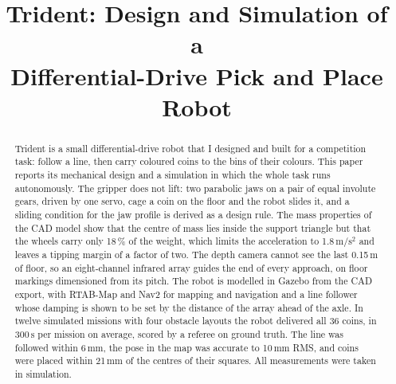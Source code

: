 \documentclass[conference,a4paper]{IEEEtran}
\newcommand{\unit}[1]{\ensuremath{\,\mathrm{#1}}}
\begin{document}
\title{Trident: Design and Simulation of a\\Differential-Drive Pick and Place Robot}

\author{
}

\maketitle

\begin{abstract}
Trident is a small differential-drive robot that I designed and built for a competition
task: follow a line, then carry coloured coins to the bins of their colours. This paper
reports its mechanical design and a simulation in which the whole task runs autonomously.
The gripper does not lift: two parabolic jaws on a pair of equal involute gears, driven by
one servo, cage a coin on the floor and the robot slides it, and a sliding condition for the
jaw profile is derived as a design rule. The mass properties of the CAD model show that the
centre of mass lies inside the support triangle but that the wheels carry only 18\,\% of
the weight, which limits the acceleration to 1.8\unit{m/s^2} and leaves a tipping margin of
a factor of two. The depth camera cannot see the last 0.15\unit{m} of floor, so an
eight-channel infrared array guides the end of every approach, on floor markings
dimensioned from its pitch. The robot is modelled in Gazebo from the CAD export, with
RTAB-Map and Nav2 for mapping and navigation and a line follower whose damping is shown to
be set by the distance of the array ahead of the axle. In twelve simulated missions with
four obstacle layouts the robot delivered all 36 coins, in 300\unit{s} per mission on
average, scored by a referee on ground truth. The line was followed within 6\unit{mm}, the
pose in the map was accurate to 10\unit{mm} RMS, and coins were placed within 21\unit{mm} of
the centres of their squares. All measurements were taken in simulation.
\end{abstract}
\end{document}
